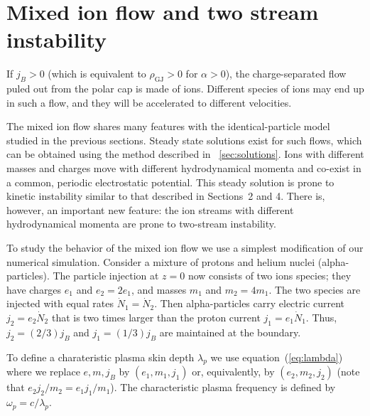 
\section{Mixed ion flow and two stream instability}
\label{sec:pc-ions}


If $j_B>0$ (which is equivalent to $\rho_\mathrm{GJ}>0$ for $\alpha>0$), the
charge-separated flow puled out from the polar cap is made of ions.
Different species of ions may end up in such a flow, and they will be
accelerated to different velocities.

The mixed ion flow shares many features with the identical-particle model
studied in the previous sections. Steady state solutions exist for such flows,
which can be obtained using the method described in \Sect~\ref{sec:solutions}.
Ions with different masses and charges move with different hydrodynamical
momenta and co-exist in a common, periodic electrostatic potential.
This steady solution
is prone to kinetic instability similar to that described in Sections~2 and 4.
%
There is, however, an important new feature: the ion streams with
different hydrodynamical momenta are prone to two-stream instability.

To study the behavior of the mixed ion flow we use a simplest modification of
our numerical simulation. Consider a mixture of protons and helium nuclei
(alpha-particles).
The particle injection at $z=0$ now consists of two ions species; they have
charges $e_1$ and $e_2=2e_1$, and masses $m_1$ and $m_2=4m_1$.
The two species are injected with equal rates $\dot{N}_1=\dot{N}_2$.
Then alpha-particles carry electric current $j_2=e_2\dot{N}_2$ that is
two times larger than the proton current $j_1=e_1\dot{N}_1$. Thus,
$j_2=(2/3)j_B$ and $j_1=(1/3)j_B$ are maintained at the boundary.

To define a charateristic plasma skin depth $\lambda_p$ we use
equation~(\ref{eq:lambda}) where we replace $e,m,j_B$ by $(e_1,m_1,j_1)$
or, equivalently, by $(e_2,m_2,j_2)$ (note that $e_2j_2/m_2=e_1j_1/m_1$).
The characteristic plasma frequency is defined by $\omega_p=c/\lambda_p$.


